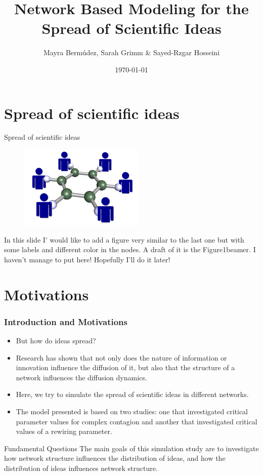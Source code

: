 \documentclass{beamer}
\title[Short title of the talk]{Network Based Modeling for the Spread of Scientific Ideas }
\author{Mayra Berm\'udez, Sarah Grimm \& Sayed-Rzgar Hosseini}
\institute[U of X]
{ ETH Zurich \\
\medskip
}
\date{\today}
\begin{document}
%
\begin{frame}
\titlepage
\end{frame}
%
\begin{frame}
\tableofcontents[pausesections]
\end{frame}
%
\section{Spread of scientific ideas}
%
\begin{frame}
{Spread of scientific ideas}
\begin{figure}
[htp]
\begin{center}
\includegraphics{science_network_150}
\end{center}
\label {fig1}
\end{figure}
\end{frame}
%
\begin{frame}
\alert{In this slide I' would like to add a figure very similar to the last one but with some labels and different color in the nodes. A draft of it is the Figure1beamer. I haven't manage to put here! Hopefully I'll do it later!}
\end{frame}
%
\section{Motivations}
%
\begin{frame}
\frametitle{Introduction and Motivations}
\begin{itemize}
\item But how do ideas spread? \pause
\item Research has shown that not only does the nature of information or innovation influence the diffusion of it, but also that the structure of a network influences the diffusion dynamics. \pause
\end{itemize}
\end{frame}
%
\begin{frame}
\begin{itemize}
\item Here, we try to simulate the spread of scientific ideas in different networks. \pause
\item The model presented is based on two studies: one that investigated critical parameter values for complex contagion and another that investigated critical values of a rewiring parameter.\pause
\end{itemize}
\end{frame}
%
\begin{frame}
{Fundamental Questions}
The main goals of this simulation study are to investigate how network structure influences the distribution of ideas, and how the distribution of ideas influences network structure.
\end{frame}
%
\end{document}
